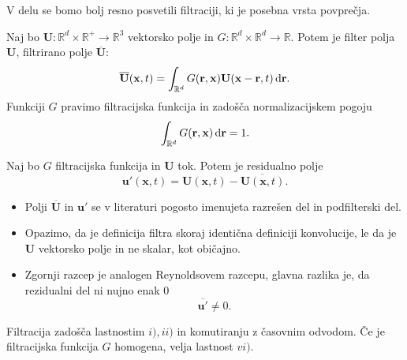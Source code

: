 \documentclass[mat2, tisk]{fmfdelo}
\newcommand{\R}{\mathbb R}
\newcommand{\bd}{\textbf}
\begin{document}
V delu se bomo bolj resno posvetili filtraciji, ki je posebna vrsta povprečja.
\begin{definicija}
Naj bo $\bd{U}: \R^d\times \R^+ \rightarrow \R^3$ vektorsko polje in $G: \R^d\times \R^d \rightarrow \R$.
Potem je filter polja $\bd{U}$, filtrirano polje $\overline{\bd{U}}$:
\begin{equation}
\overline{\bd{U}}(\bd{x}, t) = \int_{\R^d} G(\bd{r}, \bd{x})\bd{U}(\bd{x}-\bd{r}, t) \dif \bd{r}.
\end{equation}
Funkciji $G$ pravimo filtracijska funkcija in zadošča normalizacijskem pogoju 
\begin{equation}
\label{renormal}
\int_{\R^d} G(\bd{r}, \bd{x}) \dif\bd{r} = 1.
\end{equation}
\end{definicija}

\begin{definicija}
Naj bo $G$ filtracijska funkcija in $\bd{U}$ tok. Potem je residualno polje 
\begin{equation}
\bd{u}'(\bd{x}, t) = \bd{U}(\bd{x}, t) - \overline{\bd{U}(\bd{x}, t)}.
\end{equation}
\end{definicija}

\begin{opomba}
  \hfill
\begin{itemize}
\item Polji $\overline{\bd{U}}$ in $\bd{u}'$ se v literaturi pogosto imenujeta razrešen del in podfilterski del.
\item Opazimo, da je definicija filtra skoraj identična definiciji konvolucije, le da je  
$\bd{U}$ vektorsko polje in ne skalar, kot običajno.
\item Zgornji razcep je analogen Reynoldsovem razcepu, glavna razlika je, da rezidualni 
del ni nujno enak $0$
$$ \overline{\bd{u}'} \neq 0.$$
\end{itemize}
\end{opomba}

\begin{trditev}
Filtracija zadošča lastnostim $i), ii)$ in komutiranju z časovnim odvodom. 
Če je filtracijska funkcija $G$ homogena, velja lastnost $vi)$.
\end{trditev}
\end{document}
